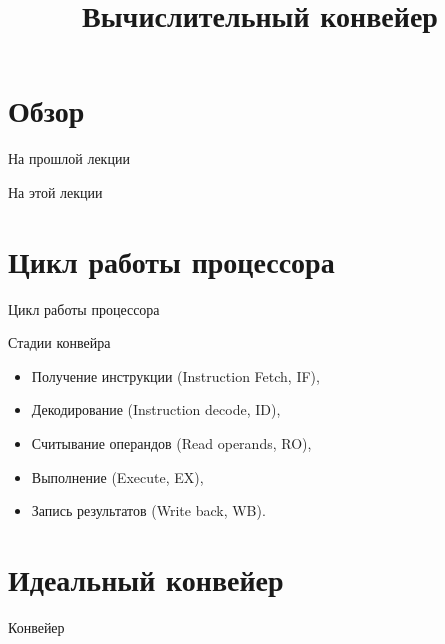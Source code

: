 

\title{Вычислительный конвейер}



\begin{frame}
\titlepage
\end{frame}

\section*{Обзор}

\begin{frame}{На прошлой лекции}
\end{frame}

\begin{frame}{На этой лекции}
\tableofcontents
\end{frame}

\section{Цикл работы процессора}

\begin{frame}{Цикл работы процессора}
\centering
{}
\end{frame}

\begin{frame}{Стадии конвейра}
\begin{itemize}
    \item Получение инструкции (Instruction Fetch, IF),
    \item Декодирование (Instruction decode, ID),
    \item Считывание операндов (Read operands, RO),
    \item Выполнение (Execute, EX),
    \item Запись результатов (Write back, WB).
\end{itemize}
\end{frame}

\begin{frame}
\centering
{}
\end{frame}

\section{Идеальный конвейер}

\begin{frame}{Конвейер}
\centering
{}
\end{frame}

